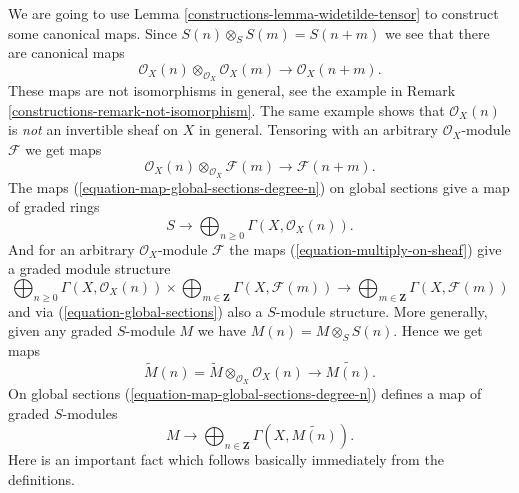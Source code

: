 We are going to use Lemma \ref{constructions-lemma-widetilde-tensor}
to construct some canonical maps.
Since $S(n) \otimes_S S(m) = S(n + m)$ we see that there
are canonical maps
\begin{equation}
\label{equation-multiply}
\mathcal{O}_X(n) \otimes_{\mathcal{O}_X} \mathcal{O}_X(m)
\longrightarrow
\mathcal{O}_X(n + m).
\end{equation}
These maps are not isomorphisms in general, see the example in
Remark \ref{constructions-remark-not-isomorphism}. The same example shows
that $\mathcal{O}_X(n)$ is {\it not} an invertible sheaf on $X$ in
general. Tensoring with an arbitrary $\mathcal{O}_X$-module $\mathcal{F}$
we get maps
\begin{equation}
\label{equation-multiply-on-sheaf}
\mathcal{O}_X(n) \otimes_{\mathcal{O}_X} \mathcal{F}(m)
\longrightarrow
\mathcal{F}(n + m).
\end{equation}
The maps (\ref{equation-map-global-sections-degree-n})
on global sections give a map of graded rings
\begin{equation}
\label{equation-global-sections}
S \longrightarrow \bigoplus\nolimits_{n \geq 0} \Gamma(X, \mathcal{O}_X(n)).
\end{equation}
And for an arbitrary $\mathcal{O}_X$-module $\mathcal{F}$ the maps
(\ref{equation-multiply-on-sheaf}) give a graded module structure
\begin{equation}
\label{equation-global-sections-module}
\bigoplus\nolimits_{n \geq 0} \Gamma(X, \mathcal{O}_X(n))
\times
\bigoplus\nolimits_{m \in \mathbf{Z}} \Gamma(X, \mathcal{F}(m))
\longrightarrow
\bigoplus\nolimits_{m \in \mathbf{Z}} \Gamma(X, \mathcal{F}(m))
\end{equation}
and via (\ref{equation-global-sections}) also a $S$-module structure.
More generally, given any graded $S$-module
$M$ we have $M(n) = M \otimes_S S(n)$. Hence we get maps
\begin{equation}
\label{equation-multiply-more-generally}
\widetilde M(n)
=
\widetilde M
\otimes_{\mathcal{O}_X}
\mathcal{O}_X(n)
\longrightarrow
\widetilde{M(n)}.
\end{equation}
On global sections (\ref{equation-map-global-sections-degree-n})
defines a map of graded $S$-modules
\begin{equation}
\label{equation-global-sections-more-generally}
M \longrightarrow
\bigoplus\nolimits_{n \in \mathbf{Z}} \Gamma(X, \widetilde{M(n)}).
\end{equation}
Here is an important fact which follows basically immediately from the
definitions.

